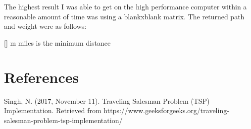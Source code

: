 \documentclass[12pt]{article}
\begin{document}
The highest result I was able to get on the high performance computer within
a reasonable amount of time was using a blankxblank matrix. The returned path and
weight were as follows:

\begin{center}
       [] m miles is the minimum distance
       \end{center}

\section*{References}

Singh, N. (2017, November 11). Traveling Salesman Problem (TSP) Implementation. Retrieved from https://www.geeksforgeeks.org/traveling-salesman-problem-tsp-implementation/
\end{document}
